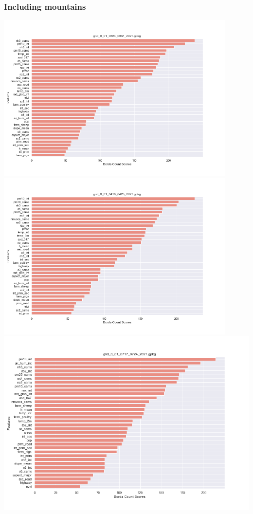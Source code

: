 \subsubsection{Including mountains}
\begin{center}
\includegraphics[width=0.9\textwidth]{images/fs_results/pm25/001/montains/grid_0_01_0324_0331_2021.png}
\includegraphics[width=0.9\textwidth]{images/fs_results/pm25/001/montains/grid_0_01_0418_0425_2021.png}
\includegraphics[width=.9\textwidth]{images/fs_results/pm25/001/montains/grid_0_01_0717_0724_2021.png}

\end{center}
